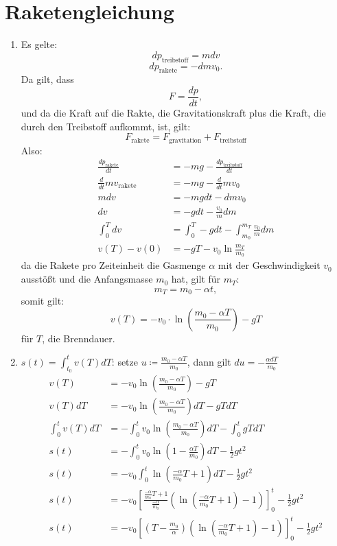 \documentclass[sectionformat = aufgabe]{gadsescript}
\begin{document}
\section{Raketengleichung}
\begin{enumerate}[label=\alph*)]
	\item Es gelte:
		\[ dp_{\text{treibstoff}} = mdv \] 
		\[ dp_{\text{rakete}} = - dm v_0.\]
		Da gilt, dass
		\[F = \frac{dp}{dt}, \]
		und da die Kraft auf die Rakte, die Gravitationskraft plus die Kraft, die durch den Treibstoff aufkommt, ist, gilt:
		\[F_{\text{rakete}} = F_{\text{gravitation}} + F_{\text{treibstoff}} \]
		Also:
		\begin{align*}
			\frac{dp_{\text{rakete}}}{dt} &= -mg - \frac{dp_{\text{treibstoff}}}{dt}\\
			\frac{d}{dt} mv_{\text{rakete}} &= -mg - \frac{d}{dt} mv_0 \\
			mdv &= -mgdt - dmv_0 \\
			dv &= -gdt - \frac{v_0}{m}dm \\
			\int_0^T dv &= \int_0^T -gdt - \int_{m_0}^{m_T} \frac{v_0}{m}dm\\
			 v(T) - v(0) &= - gT - v_0\ln\frac{m_T}{m_0}
		\end{align*}
		da die Rakete pro Zeiteinheit die Gasmenge $\alpha$ mit der Geschwindigkeit $v_0$ ausstößt und die Anfangsmasse $m_0$ hat, gilt für $m_T$:
		\[ m_T = m_0 - \alpha t, \]somit gilt:
		\[ v(T) = -v_0 \cdot \ln(\frac{m_0 - \alpha T}{m_0}) - gT \]
		für $T$, die Brenndauer.
	\item $s(t) = \int_{t_0}^{t} v(T) dT$:
		setze $ u \coloneqq \frac{m_0 - \alpha T}{m_0} $, dann gilt $ du = - \frac{\alpha dT}{m_0} $
		\begin{align*}
			v(T) &= - v_0\ln(\frac{m_0 - \alpha T}{m_0}) - gT\\
			v(T)dT &= - v_0\ln(\frac{m_0 - \alpha T}{m_0})dT - gTdT\\
			\int_0^t v(T)dT &= - \int_0^t v_0\ln(\frac{m_0 - \alpha T}{m_0})dT - \int_0^tgTdT\\
			s(t) &= - \int_0^t v_0\ln(1 - \frac{\alpha T}{m_0})dT - \frac{1}{2}gt^2\\
			s(t) &= - v_0\int_0^t \ln(\frac{-\alpha}{m_0}T + 1)dT - \frac{1}{2}gt^2\\
			s(t) &= - v_0 \left[\frac{\frac{-\alpha}{m_0}T + 1}{\frac{-\alpha}{m_0}} \left( \ln(\frac{-\alpha}{m_0}T + 1) - 1 \right)\right]_0^t - \frac{1}{2}gt^2\\
			s(t) &= - v_0 \left[\left(T - \frac{m_0}{\alpha}\right) \left( \ln(\frac{-\alpha}{m_0}T + 1) - 1\right)\right]_0^t - \frac{1}{2}gt^2\\

\end{align*}
\end{enumerate}
\end{document}
